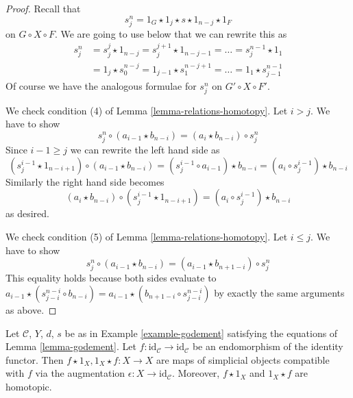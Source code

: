 \begin{proof}
\medskip\noindent
Recall that
$$
s^n_j = 1_G \star 1_j \star s \star 1_{n - j} \star 1_F
$$
on $G \circ X \circ F$. We are going to use below
that we can rewrite this as
\begin{align*}
s^n_j
& =
s^j_j \star 1_{n - j} = s^{j + 1}_j \star 1_{n - j - 1} = \ldots =
s^{n - 1}_j \star 1_1 \\
& =
1_j \star s^{n - j}_0 = 1_{j - 1} \star s^{n - j + 1}_1 = \ldots =
1_1 \star s^{n - 1}_{j - 1}
\end{align*}
Of course we have the analogous formulae for $s^n_j$ on $G' \circ X \circ F'$.

\medskip\noindent
We check condition (4) of Lemma \ref{lemma-relations-homotopy}.
Let $i > j$. We have to show
$$
s^n_j \circ (a_{i - 1} \star b_{n - i}) =
(a_i \star b_{n - i}) \circ s^n_j
$$
Since $i - 1 \geq j$ we can rewrite the left hand side as
$$
(s^{i - 1}_j \star 1_{n - i + 1}) \circ (a_{i - 1} \star b_{n - i}) =
(s^{i - 1}_j \circ a_{i - 1}) \star b_{n - i} =
(a_i \circ s^{i - 1}_j) \star b_{n - i}
$$
Similarly the right hand side becomes
$$
(a_i \star b_{n - i}) \circ (s^{i - 1}_j \star 1_{n - i + 1}) =
(a_i \circ s^{i - 1}_j) \star b_{n - i}
$$
as desired.

\medskip\noindent
We check condition (5) of Lemma \ref{lemma-relations-homotopy}.
Let $i \leq j$. We have to show
$$
s^n_j \circ (a_{i - 1} \star b_{n - i}) =
(a_{i - 1} \star b_{n + 1 - i}) \circ s^n_j
$$
This equality holds because both sides evaluate to
$a_{i - 1} \star (s^{n - i}_{j - i} \circ b_{n - i}) =
a_{i - 1} \star (b_{n + 1 - i} \circ s^{n - i}_{j - i})$
by exactly the same arguments as above.
\end{proof}

\begin{lemma}
\label{lemma-godement-before-after}
Let $\mathcal{C}$, $Y$, $d$, $s$ be as in Example \ref{example-godement}
satisfying the equations of Lemma \ref{lemma-godement}. Let
$f : \text{id}_\mathcal{C} \to \text{id}_\mathcal{C}$ be an endomorphism
of the identity functor. Then $f \star 1_X, 1_X \star f : X \to X$
are maps of simplicial objects compatible with $f$ via the augmentation
$\epsilon : X \to \text{id}_\mathcal{C}$. Moreover, $f \star 1_X$
and $1_X \star f$ are homotopic.
\end{lemma}

